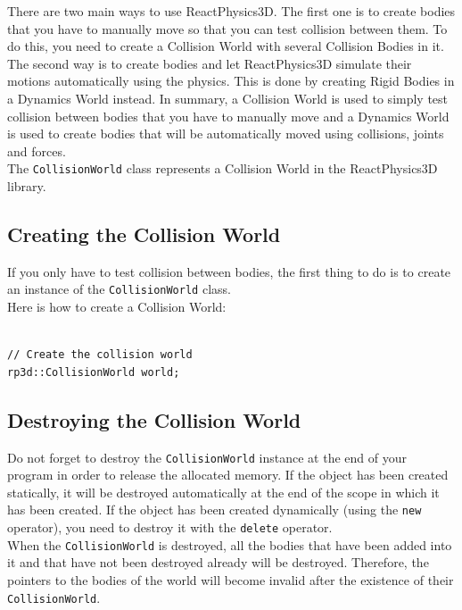 \documentclass[a4paper,12pt]{article}
\begin{document}
    There are two main ways to use ReactPhysics3D. The first one is to create bodies that you have to manually move so that you can test collision between them. To do this,
    you need to create a Collision World with several Collision Bodies in it. The second way is to create bodies and let ReactPhysics3D simulate their motions automatically using the
    physics. This is done by creating Rigid Bodies in a Dynamics World instead. In summary, a Collision World is used to simply test collision between bodies that you have to manually move
    and a Dynamics World is used to create bodies that will be automatically moved using collisions, joints and forces. \\

    The \texttt{CollisionWorld} class represents a Collision World in the ReactPhysics3D library.

    \subsection{Creating the Collision World}

    If you only have to test collision between bodies, the first thing to do is to create an instance of the \texttt{CollisionWorld} class. \\

    Here is how to create a Collision World: \\

    \begin{lstlisting}

// Create the collision world
rp3d::CollisionWorld world;
    \end{lstlisting}

    \subsection{Destroying the Collision World}

    Do not forget to destroy the \texttt{CollisionWorld} instance at the end of your program in order to release the allocated memory. If the object has been created
    statically, it will be destroyed automatically at the end of the scope in which it has been created. If the object has been created dynamically (using the \texttt{new}
    operator), you need to destroy it with the \texttt{delete} operator. \\

    When the \texttt{CollisionWorld} is destroyed, all the bodies that have been added into it and that have not been destroyed already will be destroyed.
    Therefore, the pointers to the bodies of the world will become invalid after the existence of their \texttt{CollisionWorld}.
\end{document}
